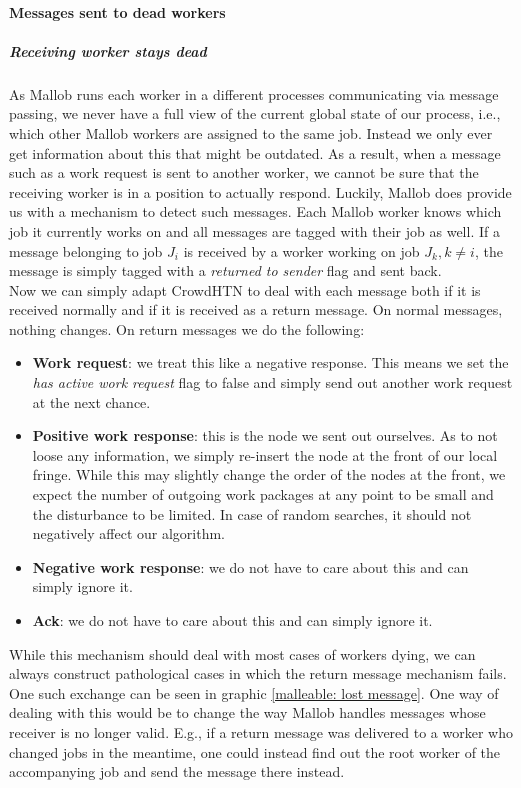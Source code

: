\paragraph{Messages sent to dead workers}

\subparagraph{Receiving worker stays dead}
As Mallob runs each worker in a different processes communicating via message passing, we never have a full view of the current global state of our process, i.e., which other Mallob workers are assigned to the same job. Instead we only ever get information about this that might be outdated. As a result, when a message such as a work request is sent to another worker, we cannot be sure that the receiving worker is in a position to actually respond. Luckily, Mallob does provide us with a mechanism to detect such messages. Each Mallob worker knows which job it currently works on and all messages are tagged with their job as well. If a message belonging to job $J_i$ is received by a worker working on job $J_k, k \neq i$, the message is simply tagged with a \textit{returned to sender} flag and sent back. \\
Now we can simply adapt CrowdHTN to deal with each message both if it is received normally and if it is received as a return message. On normal messages, nothing changes. On return messages we do the following:
\begin{itemize}
	\item \textbf{Work request}: we treat this like a negative response. This means we set the \textit{has active work request} flag to false and simply send out another work request at the next chance.
	\item \textbf{Positive work response}: this is the node we sent out ourselves. As to not loose any information, we simply re-insert the node at the front of our local fringe. While this may slightly change the order of the nodes at the front, we expect the number of outgoing work packages at any point to be small and the disturbance to be limited. In case of random searches, it should not negatively affect our algorithm.
	\item \textbf{Negative work response}: we do not have to care about this and can simply ignore it.
	\item \textbf{Ack}: we do not have to care about this and can simply ignore it.
\end{itemize}
While this mechanism should deal with most cases of workers dying, we can always construct pathological cases in which the return message mechanism fails. One such exchange can be seen in graphic \ref{malleable: lost message}. One way of dealing with this would be to change the way Mallob handles messages whose receiver is no longer valid. E.g., if a return message was delivered to a worker who changed jobs in the meantime, one could instead find out the root worker of the accompanying job and send the message there instead.
